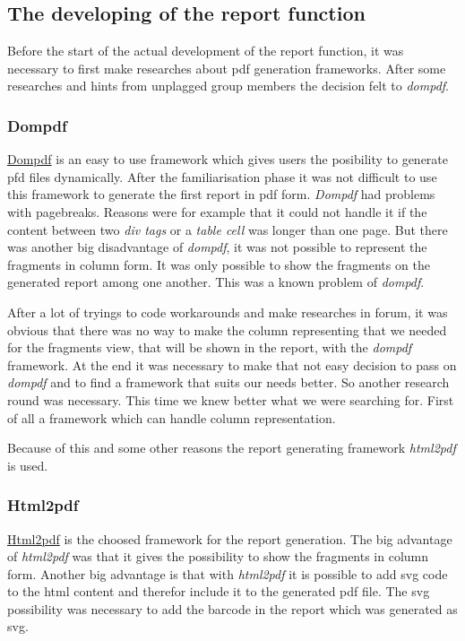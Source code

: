 \subsection{The developing of the report function}

Before the start of the actual development of the report function, it was necessary to first make researches about pdf generation frameworks. After some researches and hints from unplagged group members the decision felt to \textit{dompdf}. 

\subsubsection{Dompdf}

 \href{http://code.google.com/p/dompdf/}{Dompdf} is an easy to use framework which gives users the posibility to generate pfd files dynamically. After the familiarisation phase it was not difficult to use this framework to generate the first report in pdf form. \textit{Dompdf} had problems with pagebreaks. Reasons were for example that it could not handle it if the content between two \textit{div tags} or a \textit{table cell} was longer than one page.
But there was another big disadvantage of \textit{dompdf}, it was not possible to represent the fragments in column form. It was only possible to show the fragments on the generated report among one another. This was a known problem of \textit{dompdf}.

After a lot of tryings to code workarounds and make researches in forum, it was obvious that there was no way to make the column representing that we needed for the fragments view, that will be shown in the report, with the \textit{dompdf} framework. At the end it was necessary to make that not easy decision to pass on \textit{dompdf} and to find a framework that suits our needs better.
So another research round was necessary. This time we knew better what we were searching for. First of all a framework which can handle column representation.

Because of this and some other reasons the report generating framework \textit{html2pdf} is used.

\subsubsection{Html2pdf}

\href{http://html2fpdf.sourceforge.net/}{Html2pdf} is the choosed framework for the report generation. The big advantage of \textit{html2pdf} was that it gives the possibility to show the fragments in column form. Another big advantage is that with \textit{html2pdf} it is possible to add svg code to the html content and therefor include it to the generated pdf file. The svg possibility was necessary to add the barcode in the report which was generated as svg.

